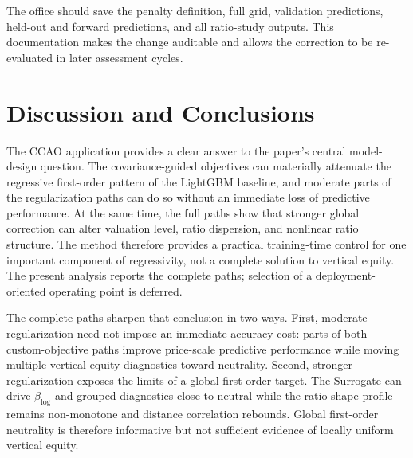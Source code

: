 \documentclass[10pt]{article}
\theoremstyle{definition}
\newcommand{\1}{\mathbf{1}}
\newcommand{\oldtext}[1]{\textcolor{blue}{\sout{#1}}}
\newcommand{\newtext}[1]{\textcolor{impGreen}{#1}}
\begin{document}
The office should save the penalty definition, full grid, validation predictions, held-out and forward predictions, and all ratio-study outputs. This documentation makes the change auditable and allows the correction to be re-evaluated in later assessment cycles.

\section{Discussion and Conclusions}
\label{sec:discussion}

\newtext{The CCAO application provides a clear answer to the paper's central model-design question. The covariance-guided objectives can materially attenuate the regressive first-order pattern of the LightGBM baseline, and moderate parts of the regularization paths can do so without an immediate loss of predictive performance. At the same time, the full paths show that stronger global correction can alter valuation level, ratio dispersion, and nonlinear ratio structure. The method therefore provides a practical training-time control for one important component of regressivity, not a complete solution to vertical equity. The present analysis reports the complete paths; selection of a deployment-oriented operating point is deferred.}

The complete paths sharpen that conclusion in two ways. First, moderate
regularization need not impose an immediate accuracy cost: parts of both
custom-objective paths improve price-scale predictive performance while moving
multiple vertical-equity diagnostics toward neutrality. Second, stronger
regularization exposes the limits of a global first-order target. The Surrogate can
drive $\beta_{\log}$ and grouped diagnostics close to neutral while the ratio-shape
profile remains non-monotone and distance correlation rebounds. Global first-order
neutrality is therefore informative but not sufficient evidence of locally uniform
vertical equity.
\end{document}
